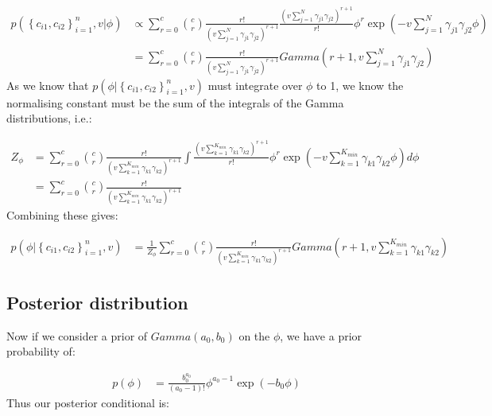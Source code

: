\documentclass[11pt]{article} %
\begin{document}
\begin{align}
 p(\left\{c_{i1}, c_{i2}\right\}_{i=1}^n, v | \phi) &\propto  \sum_{r=0}^c \binom{c}{r} \frac{r!}{\left(v \sum_{j=1}^N \gamma_{j1} \gamma_{j2}\right)^{r+1}}  \frac{\left(v \sum_{j=1}^N \gamma_{j1} \gamma_{j2}\right)^{r+1}}{r!}\phi^r \exp\left(-v \sum_{j=1}^N \gamma_{j1} \gamma_{j2}\phi\right) \\
&= \sum_{r=0}^c  \binom{c}{r} \frac{r!}{\left(v \sum_{j=1}^N \gamma_{j1} \gamma_{j2}\right)^{r+1}} Gamma\left(r+1, v \sum_{j=1}^N \gamma_{j1} \gamma_{j2} \right)
\end{align}
As we know that $p(\phi | \left\{c_{i1}, c_{i2}\right\}_{i=1}^n, v)$ must integrate over $\phi$ to 1, we know the normalising constant must be the sum of the integrals of the Gamma distributions, i.e.:

\begin{align}
Z_{\phi} &= \sum_{r=0}^c   \binom{c}{r} \frac{r!}{\left(v \sum_{k=1}^{K_{min}} \gamma_{k1} \gamma_{k2}\right)^{r+1}}  \int\frac{\left(v \sum_{k=1}^{K_{min}} \gamma_{k1} \gamma_{k2}\right)^{r+1}}{r!}\phi^r \exp\left(-v \sum_{k=1}^{K_{min}} \gamma_{k1} \gamma_{k2}\phi\right) d\phi \\
&= \sum_{r=0}^c  \binom{c}{r} \frac{r!}{\left(v \sum_{k=1}^{K_{min}} \gamma_{k1} \gamma_{k2}\right)^{r+1}}  \label{Z_phi}
\end{align}
Combining these gives:

\begin{align}
p(\phi | \left\{c_{i1}, c_{i2}\right\}_{i=1}^n, v) &= \frac{1}{Z_{\phi}}  \sum_{r=0}^c  \binom{c}{r} \frac{r!}{\left(v \sum_{k=1}^{K_{min}} \gamma_{k1} \gamma_{k2}\right)^{r+1}} Gamma\left(r+1, v \sum_{k=1}^{K_{min}} \gamma_{k1} \gamma_{k2} \right)
\end{align}

\subsection{Posterior distribution}

Now if we consider a prior of $Gamma(a_0, b_0)$ on the $\phi$, we have a prior probability of:

\begin{align}
p(\phi) &= \frac{b_0^{a_0}}{(a_0 - 1)!}\phi^{a_0 - 1}\exp\left(-b_0 \phi \right)
\end{align}
Thus our posterior conditional is:

\end{document}
